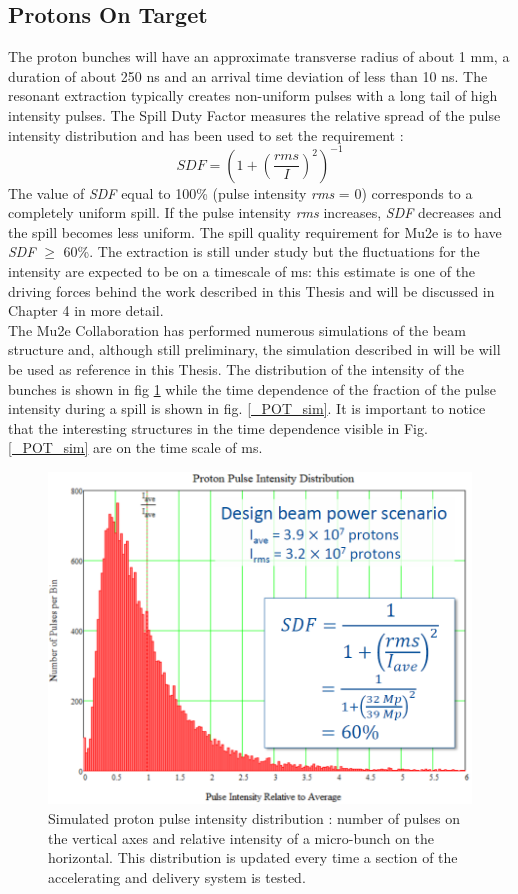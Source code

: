 \documentclass[12pt,a4paper,openright, oneside, titlepage]{book} %
\begin{document}
\subsection{Protons On Target}
The proton bunches will have an approximate transverse radius of about 1 mm, a duration of about 250 ns and an arrival time deviation of less than 10 ns.
The resonant extraction typically creates non-uniform pulses with a long tail of high intensity pulses. 
The Spill Duty Factor measures the relative spread of the pulse intensity distribution and has been used to set the requirement \cite{BeamRequirements}:
$$SDF=\left(1+\left(\frac{rms}{I}\right)^2\right)^{-1}$$
The value of {\em SDF} equal to 100\% (pulse intensity {\em rms} = 0) corresponds to a completely uniform spill. 
If the pulse intensity {\em rms} increases, {\em SDF} decreases and the spill becomes less uniform.
The spill quality requirement for Mu2e is to have {\em SDF} $\geqslant$  60\%.
The extraction is still under study but the fluctuations for the intensity are expected to be on a timescale of ms: this estimate is one of the driving forces behind the work described in this Thesis and will be discussed in Chapter 4 in more detail.\\
The Mu2e Collaboration has performed numerous simulations of the beam structure and, although still preliminary, the simulation described in \cite{SpillSim} will be will be used as reference in this Thesis. 
The distribution of the intensity of the bunches is shown in fig \ref{_POT_distribution} while the time dependence of the fraction of the pulse intensity during a spill is shown in fig. \ref{_POT_sim}. 
It is important to notice that the interesting structures in the time dependence visible in Fig. \ref{_POT_sim} are on the time scale of ms.
\label{_Fluctuations}

\begin{figure}[!htb]
\centering
\includegraphics[scale=0.7]{POT_distribution}
\caption[Proton pulse intensity]{Simulated proton pulse intensity distribution \cite{SpillSim}: 
number of pulses on the vertical axes and relative intensity of a micro-bunch on the horizontal. 
This distribution is updated every time a section of the accelerating and delivery system is tested.}
\label{_POT_distribution}
\end{figure}
\end{document}
